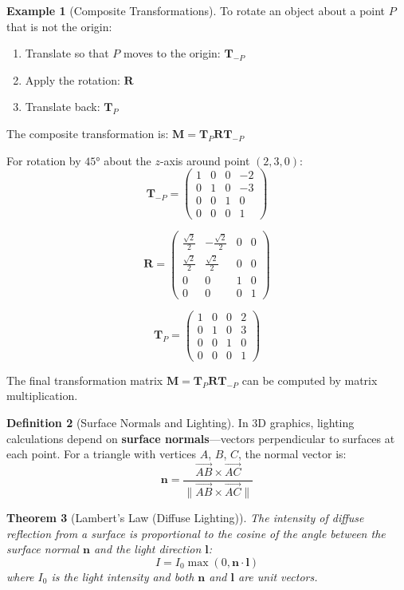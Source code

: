 \documentclass[12pt]{article}
\numberwithin{equation}{section}
\newcommand{\vect}[1]{\boldsymbol{#1}}   %
\newcommand{\mat}[1]{\mathbf{#1}}        %
\theoremstyle{plain}
\newtheorem{theorem}{Theorem}[section]
\theoremstyle{definition}
\newtheorem{definition}[theorem]{Definition}
\newtheorem{example}[theorem]{Example}
\theoremstyle{remark}
\begin{document}
\begin{example}[Composite Transformations]
To rotate an object about a point $P$ that is not the origin:
\begin{enumerate}
\item Translate so that $P$ moves to the origin: $\mat{T}_{-P}$
\item Apply the rotation: $\mat{R}$
\item Translate back: $\mat{T}_P$
\end{enumerate}

The composite transformation is: $\mat{M} = \mat{T}_P \mat{R} \mat{T}_{-P}$

For rotation by $45°$ about the $z$-axis around point $(2, 3, 0)$:
$$\mat{T}_{-P} = \begin{pmatrix} 1 & 0 & 0 & -2 \\ 0 & 1 & 0 & -3 \\ 0 & 0 & 1 & 0 \\ 0 & 0 & 0 & 1 \end{pmatrix}$$

$$\mat{R} = \begin{pmatrix} \frac{\sqrt{2}}{2} & -\frac{\sqrt{2}}{2} & 0 & 0 \\ \frac{\sqrt{2}}{2} & \frac{\sqrt{2}}{2} & 0 & 0 \\ 0 & 0 & 1 & 0 \\ 0 & 0 & 0 & 1 \end{pmatrix}$$

$$\mat{T}_P = \begin{pmatrix} 1 & 0 & 0 & 2 \\ 0 & 1 & 0 & 3 \\ 0 & 0 & 1 & 0 \\ 0 & 0 & 0 & 1 \end{pmatrix}$$

The final transformation matrix $\mat{M} = \mat{T}_P \mat{R} \mat{T}_{-P}$ can be computed by matrix multiplication.
\end{example}

\begin{definition}[Surface Normals and Lighting]
In 3D graphics, lighting calculations depend on \textbf{surface normals}—vectors perpendicular to surfaces at each point. For a triangle with vertices $A$, $B$, $C$, the normal vector is:
$$\vect{n} = \frac{\overrightarrow{AB} \times \overrightarrow{AC}}{\|\overrightarrow{AB} \times \overrightarrow{AC}\|}$$
\end{definition}

\begin{theorem}[Lambert's Law (Diffuse Lighting)]
The intensity of diffuse reflection from a surface is proportional to the cosine of the angle between the surface normal $\vect{n}$ and the light direction $\vect{l}$:
$$I = I_0 \max(0, \vect{n} \cdot \vect{l})$$
where $I_0$ is the light intensity and both $\vect{n}$ and $\vect{l}$ are unit vectors.
\end{theorem}
\end{document}
